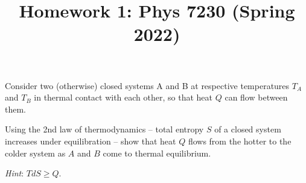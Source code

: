\documentclass[12pt]{article}
\title{Homework 1: Phys 7230 (Spring 2022)}
\begin{document}
\maketitle
\begin{problem}{1}
Consider two (otherwise) closed systems A and B at respective temperatures $T_A$
and $T_B$ in thermal contact with each other, so that heat $Q$ can flow between
them.

Using the 2nd law of thermodynamics -- total entropy $S$ of a closed system
increases under equilibration -- show that heat $Q$ flows from the hotter to the
colder system as $A$ and $B$ come to thermal equilibrium.

\textit{Hint}: $TdS\geq Q$.

\begin{solution}
\end{solution}
\end{problem}
\end{document}
